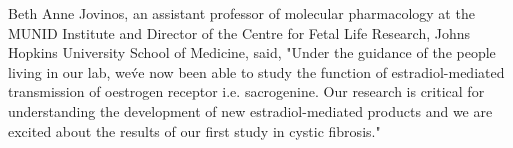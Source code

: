 \documentclass{article}
\begin{document}
Beth Anne Jovinos, an assistant professor of molecular pharmacology at the MUNID Institute and Director of the Centre for Fetal Life Research, Johns Hopkins University School of Medicine, said, "Under the guidance of the people living in our lab, we\'ve now been able to study the function of estradiol-mediated transmission of oestrogen receptor i.e. sacrogenine. Our research is critical for understanding the development of new estradiol-mediated products and we are excited about the results of our first study in cystic fibrosis."
\end{document}
